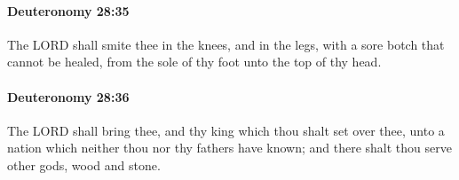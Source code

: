 		\paragraph{Deuteronomy 28:35} %
			\label{DEUTERONOMY-28-35}

			The LORD shall smite thee in the knees, and in the legs, with a sore botch that cannot be healed, from the sole of thy foot unto the top of thy head.


		\paragraph{Deuteronomy 28:36} %
			\label{DEUTERONOMY-28-36}

			The LORD shall bring thee, and thy king which thou shalt set over thee, unto a nation which neither thou nor thy fathers have known; and there shalt thou serve other gods, wood and stone.


